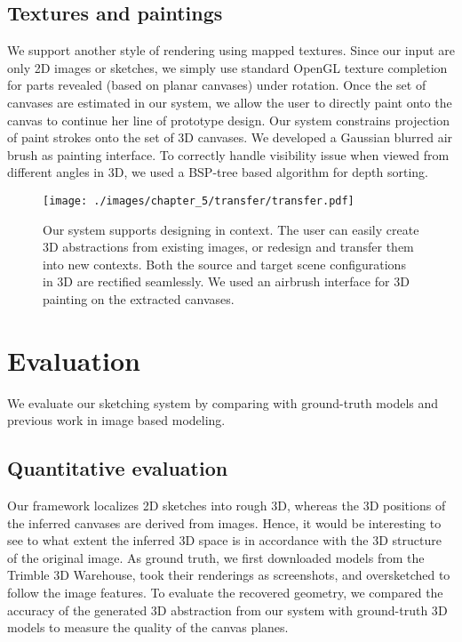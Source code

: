 {\subsection{Textures and paintings}

We support another style of rendering using mapped textures. Since our input are only 2{D} images or sketches, we simply use standard OpenGL texture completion for parts revealed (based on planar canvases) under rotation. Once the set of canvases are estimated in our system, we allow the user to directly paint onto the canvas to continue her line of prototype design. Our system constrains projection of paint strokes onto the set of 3{D} canvases. We developed a Gaussian blurred air brush as painting interface. To correctly handle visibility issue when viewed from different angles in 3{D}, we used a BSP-tree based algorithm for depth sorting.

\begin{figure}[t!]
  \texttt{[image: ./images/chapter\_5/transfer/transfer.pdf]}
  \caption{Our system supports designing in context. The user can easily create 3{D} abstractions from existing images, or redesign and transfer them into new contexts. Both the source and target scene configurations in 3{D} are rectified seamlessly. We used an airbrush interface for 3{D} painting on the extracted canvases.
  \label{fig:transfer}
  \vnudge
  }
\end{figure}

\section{Evaluation}

We evaluate our sketching system by comparing with ground-truth models and previous work in image based modeling.

\subsection{Quantitative evaluation}  Our framework localizes 2{D} sketches into rough 3{D}, whereas the 3{D} positions of the inferred canvases are derived from images. Hence, it would be interesting to see to what extent the inferred 3{D} space is in accordance with the 3{D} structure of the original image. As ground truth, we first downloaded models from the Trimble 3D Warehouse, took their renderings as screenshots, and oversketched to follow the image features. To evaluate the recovered geometry, we compared the accuracy of the generated 3D abstraction from our system with ground-truth 3{D} models to measure the quality of the canvas planes.

}
